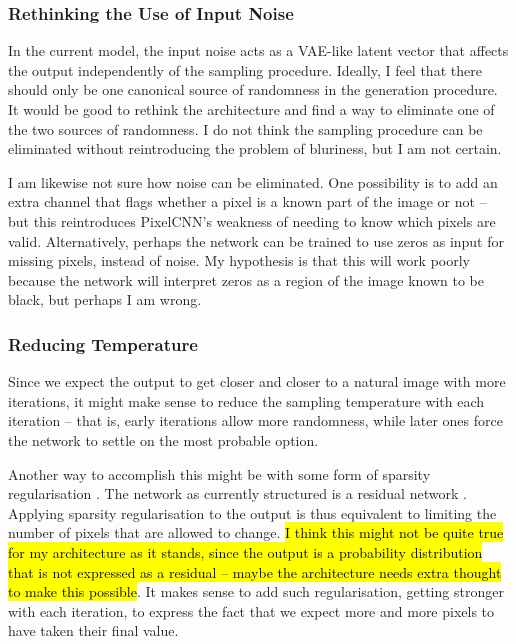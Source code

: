 \documentclass[10pt,a4paper]{article}
\begin{document}
\subsubsection{Rethinking the Use of Input Noise}

In the current model, the input noise acts as a VAE-like latent vector that affects the output independently of the sampling procedure. Ideally, I feel that there should only be one canonical source of randomness in the generation procedure. It would be good to rethink the architecture and find a way to eliminate one of the two sources of randomness. I do not think the sampling procedure can be eliminated without reintroducing the problem of bluriness, but I am not certain.

I am likewise not sure how noise can be eliminated. One possibility is to add an extra channel that flags whether a pixel is a known part of the image or not -- but this reintroduces PixelCNN's weakness of needing to know which pixels are valid. Alternatively, perhaps the network can be trained to use zeros as input for missing pixels, instead of noise. My hypothesis is that this will work poorly because the network will interpret zeros as a region of the image known to be black, but perhaps I am wrong.

\subsubsection{Reducing Temperature}

Since we expect the output to get closer and closer to a natural image with more iterations, it might make sense to reduce the sampling temperature with each iteration -- that is, early iterations allow more randomness, while later ones force the network to settle on the most probable option.

Another way to accomplish this might be with some form of sparsity regularisation \cite{??}. The network as currently structured is a residual network \cite{??}. Applying sparsity regularisation to the output is thus equivalent to limiting the number of pixels that are allowed to change. \hl{I think this might not be quite true for my architecture as it stands, since the output is a probability distribution that is not expressed as a residual -- maybe the architecture needs extra thought to make this possible}. It makes sense to add such regularisation, getting stronger with each iteration, to express the fact that we expect more and more pixels to have taken their final value.
\end{document}

